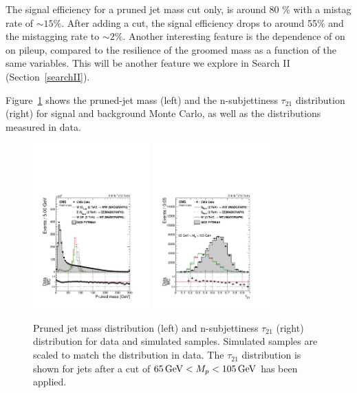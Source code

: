 The signal efficiency for a pruned jet mass cut only, is around 80 \% with a mistag rate of $\sim 15\%$. After adding a \nsubj cut, the signal efficiency drops to around 55\% and the mistagging rate to $\sim 2\%$. Another interesting feature is the dependence of \nsubj on \PT on pileup, compared to the resilience of the groomed mass as a function of the same variables. This will be another feature we explore in Search II (Section~\ref{searchII}).






Figure~\ref{fig:wtag} shows the pruned-jet mass (left) and the n-subjettiness $\tau_{21}$ distribution (right) for signal and background Monte Carlo, as well as the distributions measured in data. 

\begin{figure}[htb]
\centering
\includegraphics[width=0.4\textwidth]{figures/analysis/search1/AN-15-211/controlplots/silverjson/PrunedMass_WSignal.pdf}
\includegraphics[width=0.4\textwidth]{figures/analysis/search1/AN-15-211/controlplots/silverjson/Tau21_punzi_WSignal.pdf}\\
\caption{Pruned jet mass distribution (left) and n-subjettiness $\tau_{21}$ (right) distribution for data and simulated samples. Simulated samples are scaled to match the distribution in data. The $\tau_{21}$ distribution is shown for jets after a cut of $65 {\,\text{Ge\hspace{-.08em}V}} < M_{p} < 105 {\,\text{Ge\hspace{-.08em}V}}$ has been applied.}
\label{fig:wtag}
\end{figure}


